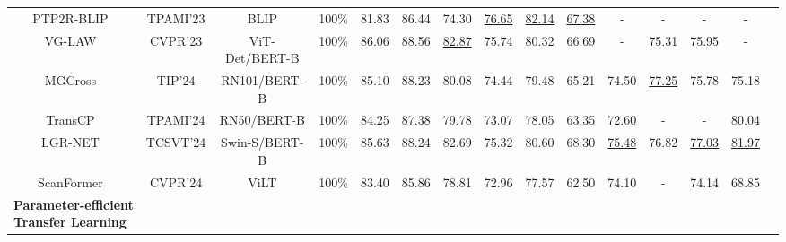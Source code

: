 \begin{table*}[!t]
{\begin{tabular}{lllccccccccccll}
\multicolumn{1}{c|}{PTP2R-BLIP~\cite{wang2023enhancing}} & \multicolumn{1}{c|}{TPAMI'23}& \multicolumn{1}{c|}{BLIP} &\multicolumn{1}{c|}{100\%}   & 81.83  & 86.44  & \multicolumn{1}{c|}{74.30}  & \underline{76.65}  & \underline{82.14}  & \multicolumn{1}{c|}{\underline{67.38}} & - & -   & \multicolumn{1}{c|}{-}  &\multicolumn{1}{c}{-} &\\

\multicolumn{1}{c|}{VG-LAW~\cite{vg-law}}      & \multicolumn{1}{c|}{CVPR'23} &\multicolumn{1}{c|}{ViT-Det/BERT-B} &\multicolumn{1}{c|}{100\%} & 86.06  & 88.56  & \multicolumn{1}{c|}{\underline{82.87}}  & 75.74  & 80.32  & \multicolumn{1}{c|}{66.69} & - & 75.31   & \multicolumn{1}{c|}{75.95}     &\multicolumn{1}{c}{-} &\\


\multicolumn{1}{c|}{MGCross~\cite{miao2023self}}      & \multicolumn{1}{c|}{TIP'24}&\multicolumn{1}{c|}{RN101/BERT-B} & \multicolumn{1}{c|}{100\%}   & 85.10  & 88.23  & \multicolumn{1}{c|}{80.08}  & 74.44  & 79.48  & \multicolumn{1}{c|}{65.21} & 74.50 & \underline{77.25}   & \multicolumn{1}{c|}{75.78}   & \multicolumn{1}{c}{75.18}&\\

\multicolumn{1}{c|}{TransCP~\cite{tang2023context}}      & \multicolumn{1}{c|}{TPAMI'24} &\multicolumn{1}{c|}{RN50/BERT-B}& \multicolumn{1}{c|}{100\%}   & 84.25  & 87.38  & \multicolumn{1}{c|}{79.78}  & 73.07  & 78.05  & \multicolumn{1}{c|}{63.35} & 72.60 & -   & \multicolumn{1}{c|}{-}     &\multicolumn{1}{c}{80.04} &\\

\multicolumn{1}{c|}{LGR-NET~\cite{lu2024lgr}}      & \multicolumn{1}{c|}{TCSVT'24} &\multicolumn{1}{c|}{Swin-S/BERT-B}& \multicolumn{1}{c|}{100\%}   & 85.63  & 88.24  & \multicolumn{1}{c|}{82.69}  & 75.32  & 80.60  & \multicolumn{1}{c|}{68.30} & \underline{75.48} & 76.82   & \multicolumn{1}{c|}{\underline{77.03}} &\multicolumn{1}{c}{\underline{81.97}} \\

\multicolumn{1}{c|}{ScanFormer~\cite{su2024scanformer}}      & \multicolumn{1}{c|}{CVPR'24} &\multicolumn{1}{c|}{ViLT}& \multicolumn{1}{c|}{100\%}   & 83.40  & 85.86  & \multicolumn{1}{c|}{78.81}  & 72.96  & 77.57  & \multicolumn{1}{c|}{62.50} & 74.10 & -  & \multicolumn{1}{c|}{74.14}     & \multicolumn{1}{c}{68.85}&\\

 
\midrule
\rowcolor{gray!20}\textbf{Parameter-efficient Transfer Learning}   & &   &  &  &  &&  && &  & &   & &\\
\midrule



\end{tabular}}
\end{table*}
